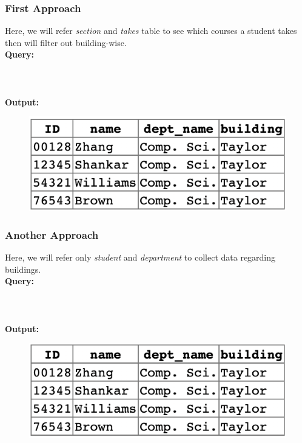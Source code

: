 \documentclass[12pt]{article}
\begin{document}
\subsubsection{First Approach}
Here, we will refer \textit{section} and \textit{takes} table to see which courses a student takes then will filter out building-wise. \\
\textbf{Query:} \\ \\
\\ \\
\textbf{Output:}
\begin{figure}[!hbt]
    \centering
    \includegraphics[scale=0.8]{screenshots/problem4aa.png}
    \label{fig:my_label1}
\end{figure}

\subsubsection{Another Approach}
Here, we will refer only \textit{student} and \textit{department} to collect data regarding buildings. \\
\textbf{Query:} \\ \\
\\ \\
\textbf{Output:}
\begin{figure}[!hbt]
    \centering
    \includegraphics[scale=0.8]{screenshots/problem4ab.png}
    \label{fig:my_label1}
\end{figure}
\newpage
\end{document}

